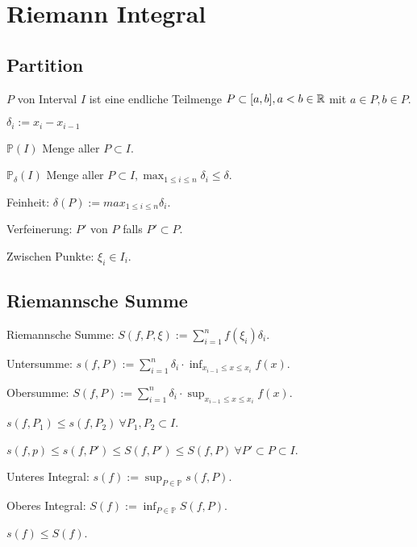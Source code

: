 
\section{Riemann Integral}
\subsection{Partition}
$P$ von Interval $I$ ist eine endliche Teilmenge $P \subset [a, b], a < b \in \mathbb{R}$ mit $a \in P, b \in P$.
\begin{inparaitem}
    \item $\delta_i := x_i - x_{i - 1}$
    \item $\mathbb{P}(I)$ Menge aller $P \subset I$.
    \item $\mathbb{P}_\delta(I)$ Menge aller $P \subset I, \max_{1 \le i \le n} \delta_i \le \delta$.
\end{inparaitem}
\begin{compactdesc}
    \item[Feinheit:] $\delta(P) := max_{1 \le i \le n} \delta_i$.
    \item[Verfeinerung:] $P'$ von $P$ falls $P' \subset P$.
    \item[Zwischen Punkte:] $\xi_i \in I_i$.
\end{compactdesc}

\subsection{Riemannsche Summe}
\begin{compactdesc}
\item[Riemannsche Summe:] $S(f, P, \xi) := \sum_{i=1}^{n} f(\xi_i) \delta_i$.
    \item[Untersumme:] $s(f, P) := \sum_{i=1}^{n} \delta_i \cdot \inf_{x_{i-1} \le x \le x_i} f(x)$.
    \item[Obersumme:] $S(f, P) := \sum_{i=1}^{n} \delta_i \cdot \sup_{x_{i-1} \le x \le x_i} f(x)$.
        \begin{compactitem}
            \item $s(f, P_1) \le s(f, P_2) \ \forall P_1, P_2 \subset I$.
            \item $s(f, p) \le s(f, P') \le S(f, P') \le S(f, P) \ \forall P' \subset P \subset I$.
        \end{compactitem}
    \item[Unteres Integral:] $s(f) := \sup_{P \in \mathbb{P}} s(f, P)$.
    \item[Oberes Integral:] $S(f) := \inf_{P \in \mathbb{P}} S(f, P)$.
        \begin{compactitem}
        \item $s(f) \le S(f)$.
        \end{compactitem}
\end{compactdesc}

